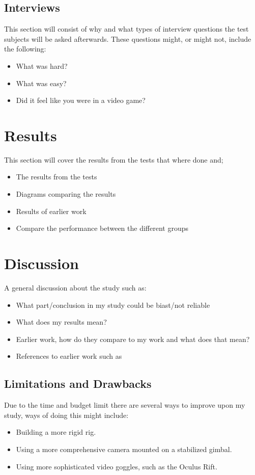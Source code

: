 \documentclass[runningheads,a4paper,oribibl]{llncs}
\begin{document}
\subsection{Interviews}

This section will consist of why and what types of interview questions the test subjects will be asked afterwards. These questions might, or might not, include the following:
\begin{itemize}
	\item What was hard?
	\item What was easy?
	\item Did it feel like you were in a video game?
\end{itemize}







\section{Results}
This section will cover the results from the tests that where done and;
\begin{itemize}
	\item The results from the tests
	\item Diagrams comparing the results
	\item Results of earlier work
	\item Compare the performance between the different groups
\end{itemize}





\section{Discussion}
A general discussion about the study such as:
\begin{itemize}
	\item What part/conclusion in my study could be biast/not reliable
	\item What does my results mean?
	\item Earlier work, how do they compare to my work and what does that mean?
	\item References to earlier work such as~\cite{schmierbach2011exploring}
\end{itemize}



\subsection{Limitations and Drawbacks}
Due to the time and budget limit there are several ways to improve upon my study, ways of doing this might include:
\begin{itemize}
	\item Building a more rigid rig.
	\item Using a more comprehensive camera mounted on a stabilized gimbal.
	\item Using more sophisticated video goggles, such as the Oculus Rift.
\end{itemize}
\end{document}
